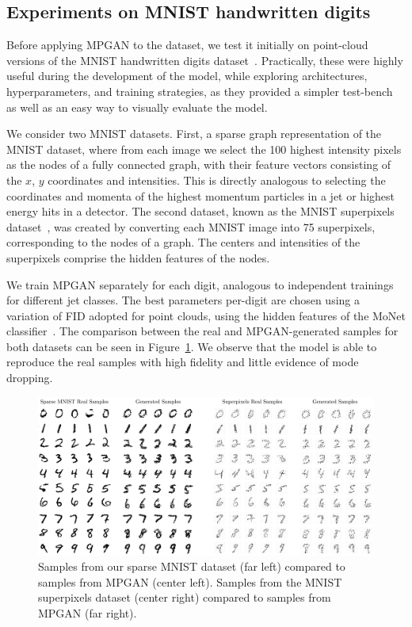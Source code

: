 \subsection{Experiments on MNIST handwritten digits}
\label{sec:04_mpgan_mnist}

Before applying MPGAN to the \jetnet dataset, we test it initially on point-cloud versions of the MNIST handwritten digits dataset~\cite{deng2012mnist}.
Practically, these were highly useful during the development of the model, while exploring architectures, hyperparameters, and training strategies, as they provided a simpler test-bench as well as an easy way to visually evaluate the model.

We consider two MNIST datasets.
First, a sparse graph representation of the MNIST dataset, where from each image we select the 100 highest intensity pixels as the nodes of a fully connected graph, with their feature vectors consisting of the $x$, $y$ coordinates and intensities.
This is directly analogous to selecting the coordinates and momenta of the highest momentum particles in a jet or highest energy hits in a detector.
The second dataset, known as the MNIST superpixels dataset~\cite{monti2017geometric}, was created by converting each MNIST image into 75 superpixels, corresponding to the nodes of a graph.
The centers and intensities of the superpixels comprise the hidden features of the nodes.

We train MPGAN separately for each digit, analogous to independent trainings for different jet classes.
The best parameters per-digit are chosen using a variation of FID adopted for point clouds, using the hidden features of the MoNet classifier~\cite{monti2017geometric}.
The comparison between the real and MPGAN-generated samples for both datasets can be seen in Figure~\ref{fig:04_mpgan_mnist}.
We observe that the model is able to reproduce the real samples with high fidelity and little evidence of mode dropping.

\begin{figure}[ht]
    \centering
    \includegraphics[width=\textwidth]{figures/04-ML4Sim/mpgan/real_gen.pdf}
    \caption{Samples from our sparse MNIST dataset (far left) compared to samples from MPGAN (center left).
    Samples from the MNIST superpixels dataset (center right) compared to samples from MPGAN (far right).\label{fig:04_mpgan_mnist}}
\end{figure}


